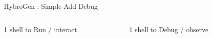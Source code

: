 \begin{Frame}{HybroGen : Simple-Add Debug}
 \begin{columns}[t]
  \begin{column}{\BW}
    \begin{block}{1 shell to Run / interact}
        
    \end{block}
  \end{column}
  \begin{column}{\BW}
    \begin{block}{1 shell to Debug / observe}
        
      \end{block}
    \end{column}
  \end{columns}
\end{Frame}
